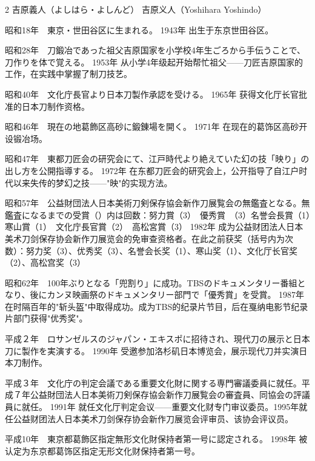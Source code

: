 \documentclass[12pt,UTF8]{ctexbook}
\begin{document}
\begin{paracol}{2}
吉原義人（よしはら・よしんど）
\switchcolumn*
吉原义人（Yoshihara Yoshindo）
\switchcolumn*

昭和18年　東京・世田谷区に生まれる。
\switchcolumn*
1943年 出生于东京世田谷区。
\switchcolumn*

昭和28年　刀鍛冶であった祖父吉原国家を小学校4年生ごろから手伝うことで、刀作りを体で覚える。
\switchcolumn*
1953年 从小学4年级起开始帮忙祖父——刀匠吉原国家的工作，在实践中掌握了制刀技艺。
\switchcolumn*

昭和40年　文化庁長官より日本刀製作承認を受ける。
\switchcolumn*
1965年 获得文化厅长官批准的日本刀制作资格。
\switchcolumn*

昭和46年　現在の地葛飾区高砂に鍛錬場を開く。
\switchcolumn*
1971年 在现在的葛饰区高砂开设锻冶场。
\switchcolumn*

昭和47年　東都刀匠会の研究会にて、江戸時代より絶えていた幻の技「映り」の出し方を公開指導する。
\switchcolumn*
1972年 在东都刀匠会的研究会上，公开指导了自江户时代以来失传的梦幻之技——"映"的实现方法。
\switchcolumn*

昭和57年　公益財団法人日本美術刀剣保存協会新作刀展覧会の無鑑査となる。無鑑査になるまでの受賞（）内は回数：努力賞（3）　優秀賞　（3）名誉会長賞（1）　寒山賞（1）　文化庁長官賞（2）　高松宮賞（3）
\switchcolumn*
1982年 成为公益财团法人日本美术刀剑保存协会新作刀展览会的免审查资格者。在此之前获奖（括号内为次数）：努力奖（3）、优秀奖（3）、名誉会长奖（1）、寒山奖（1）、文化厅长官奖（2）、高松宫奖（3）
\switchcolumn*

昭和62年　100年ぶりとなる「兜割り」に成功。TBSのドキュメンタリー番組となり、後にカンヌ映画祭のドキュメンタリー部門で「優秀賞」を受賞。
\switchcolumn*
1987年 在时隔百年的"斩头盔"中取得成功。成为TBS的纪录片节目，后在戛纳电影节纪录片部门获得"优秀奖"。
\switchcolumn*

平成２年　ロサンゼルスのジャパン・エキスポに招待され、現代刀の展示と日本刀に製作を実演する。
\switchcolumn*
1990年 受邀参加洛杉矶日本博览会，展示现代刀并实演日本刀制作。
\switchcolumn*

平成３年　文化庁の判定会議である重要文化財に関する専門審議委員に就任。平成７年公益財団法人日本美術刀剣保存協会新作刀展覧会の審査員、同協会の評議員に就任。
\switchcolumn*
1991年 就任文化厅判定会议——重要文化财专门审议委员。1995年就任公益财团法人日本美术刀剑保存协会新作刀展览会评审员、该协会评议员。
\switchcolumn*

平成10年　東京都葛飾区指定無形文化財保持者第一号に認定される。
\switchcolumn*
1998年 被认定为东京都葛饰区指定无形文化财保持者第一号。
\switchcolumn*


\end{paracol}
\end{document}
